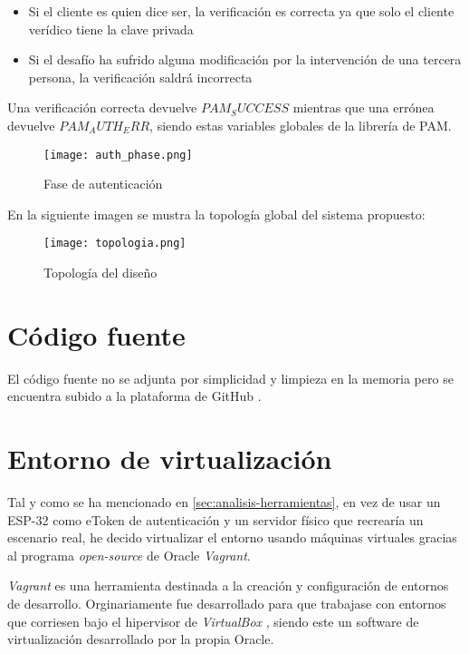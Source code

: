 \begin{itemize}
    \item Si el cliente es quien dice ser, la verificación es correcta ya que solo el cliente verídico tiene la clave privada
    \item Si el desafío ha sufrido alguna modificación por la intervención de una tercera persona, la verificación saldrá incorrecta
\end{itemize}

Una verificación correcta devuelve $PAM_SUCCESS$ mientras que una errónea devuelve $PAM_AUTH_ERR$, siendo estas variables globales
de la librería de PAM.  

\begin{figure}[H]
    \centering
    \texttt{[image: auth\_phase.png]}
    \caption{Fase de autenticación}
\end{figure}

En la siguiente imagen se mustra la topología global del sistema propuesto:

\begin{figure}[H]
    \centering
    \texttt{[image: topologia.png]}
    \caption{Topología del diseño}
\end{figure}

\section{Código fuente}

El código fuente no se adjunta por simplicidad y limpieza en la memoria pero se encuentra subido a la plataforma de GitHub 
\cite{garcia_sergiogp98mqtt-pam_2021}. 

\section{Entorno de virtualización}

Tal y como se ha mencionado en \ref{sec:analisis-herramientas}, en vez de usar un ESP-32 como eToken de autenticación y un servidor 
físico que recrearía un escenario real, he decido virtualizar el entorno usando máquinas virtuales gracias al programa 
\textit{open-source} de Oracle \textit{Vagrant}.

\textit{Vagrant} es una herramienta destinada a la creación y configuración de entornos de desarrollo. Orginariamente fue 
desarrollado para que trabajase con entornos que corriesen bajo el hipervisor de \textit{VirtualBox} \cite{virtualbox}, siendo 
este un software de virtualización desarrollado por la propia Oracle.

